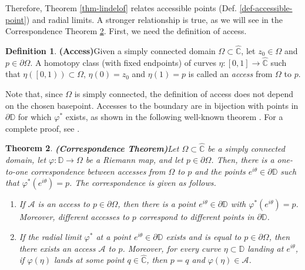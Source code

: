 \documentclass[11pt,a4paper,reqno]{amsart}
\theoremstyle{plain}
\newtheorem{thm}{Theorem}[section]
\theoremstyle{definition}
\newtheorem{defi}[thm]{Definition}
\theoremstyle{plain}
\begin{document}
Therefore, Theorem \ref{thm-lindelof} relates accessible points (Def. \ref{def-accessible-point}) and radial limits.  A stronger relationship is true, as we will see in the Correspondence Theorem \ref{correspondence-theorem}. First, we need the definition of access.
\begin{defi}{\bf (Access)}\label{def:access-sc}
	Given a simply connected domain $ \Omega\subset\widehat{\mathbb{C}} $, let $ z_0\in \Omega$ and $ p\in\partial \Omega $. A homotopy class (with fixed endpoints) of curves $ \eta\colon \left[ 0,1\right] \to\widehat{\mathbb{C}} $ such that $ \eta(\left[ 0,1\right))\subset \Omega $, $ \eta(0)=z_0 $ and $ \eta(1)=p $ is called an \textit{access} from $ \Omega $ to $ p $.
\end{defi}

Note that, since $ \Omega $ is simply connected, the definition of access does not depend on the chosen basepoint. Accesses to the boundary are in bijection with points in $ \partial \mathbb{D} $ for which $ \varphi^* $ exists, as shown in the following well-known theorem \cite[p.35, Ex. 5]{Pom92}. For a complete proof, see \cite{BFJK-Accesses}.

\begin{thm}{\bf (Correspondence Theorem)}\label{correspondence-theorem} Let $ \Omega\subset\widehat{\mathbb{C}} $ be a simply connected domain, let $ \varphi\colon\mathbb{D}\to \Omega $ be a Riemann map, and let $ p\in\partial \Omega $. Then, there is a one-to-one correspondence between accesses from $ \Omega $ to $ p $ and the points $ e^{i\theta}\in \partial \mathbb{D} $ such that $ \varphi^*(e^{i\theta})=p $. The correspondence is given as follows.\begin{enumerate}[label={\em (\alph*)}]
		\item If $ \mathcal{A} $ is an access to $ p\in\partial \Omega $, then there is a point $ e^{i\theta}\in\partial \mathbb{D} $ with $ \varphi^*(e^{i\theta})=p  $. Moreover, different accesses to $p$ correspond to different points in $ \partial\mathbb{D} $.
		\item If the radial limit $ \varphi^* $ at a point $ e^{i\theta}\in\partial\mathbb{D} $ exists and is equal to $ p\in \partial \Omega $, then there exists an access $ \mathcal{A} $ to $ p $. Moreover, for every curve $ \eta\subset \mathbb{D} $ landing at $ e^{i\theta} $, if $ \varphi(\eta) $ lands at some point $ q\in\widehat{\mathbb{C}} $, then $ p=q $ and $ \varphi(\eta)\in \mathcal{A} $.
	\end{enumerate}
\end{thm}
\end{document}
